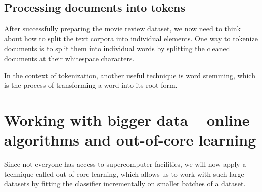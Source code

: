 \subsection{Processing documents into tokens}
After successfully preparing the movie review dataset, we now need to think about how to split the text corpora into individual elements. One way to tokenize documents is to split them into individual words by splitting the cleaned documents at their whitespace characters.

In the context of tokenization, another useful technique is word stemming, which is the process of transforming a word into its root form.
\section{Working with bigger data – online algorithms and out-of-core learning}
Since not everyone has access to supercomputer facilities, we will now apply a technique called out-of-core learning, which allows us to work with such large datasets by fitting the classifier incrementally on smaller batches of a dataset.